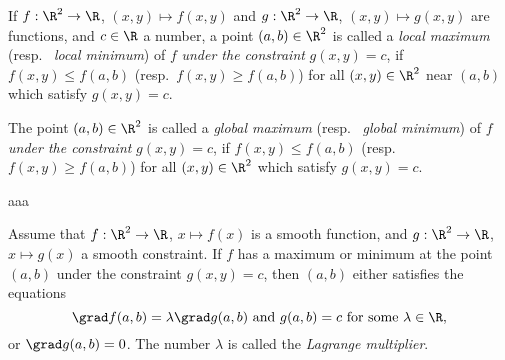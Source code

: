 \begin{definition}
   If $f:\R^2 \rightarrow \R$, $(x,y)\mapsto f(x,y)$ and $g :\R^2 \rightarrow \R$, $(x,y)\mapsto g(x,y)$ 
   are functions, and $c\in \R$ a number, a point $(a,b) \in \R^2$ is called
   a \emph{local maximum} (resp.~ \emph{local minimum}) of $f$ \emph{under the constraint} $g(x,y)=c$, if
   $f(x,y)\leq f(a,b)$ (resp.~$f(x,y)\geq f(a,b)$) for all $(x,y)\in \R^2$ near $(a,b)$ 
   which satisfy $g(x,y)=c$.

   The point $(a,b)\in \R^2$ is called a \emph{global maximum} (resp.~ \emph{global minimum}) of $f$
   \emph{under the constraint} $g(x,y)=c$, if $f(x,y)\leq f(a,b)$ (resp.~$f(x,y)\geq f(a,b)$) for all 
   $(x,y)\in \R^2$  which satisfy $g(x,y)=c$.
\end{definition}
aaa
\begin{theorem}
  Assume that $f:\R^2 \rightarrow \R$, $x\mapsto f(x)$ is a smooth function, and 
  $g:\R^2 \rightarrow \R$, $x\mapsto g(x)$ a smooth constraint. 
  If $f$ has a maximum or minimum at the point $(a,b)$ under the constraint $g(x,y)=c$, 
  then $(a,b)$ either satisfies the equations
  \[
     \grad f (a,b) = \lambda \grad g (a,b) \text{ and } g(a,b)=c \text{ for some $\lambda \in \R$},
  \]
  or $\grad g (a,b)=0$.  The number $\lambda$ is called the \emph{Lagrange multiplier}.
\end{theorem}

